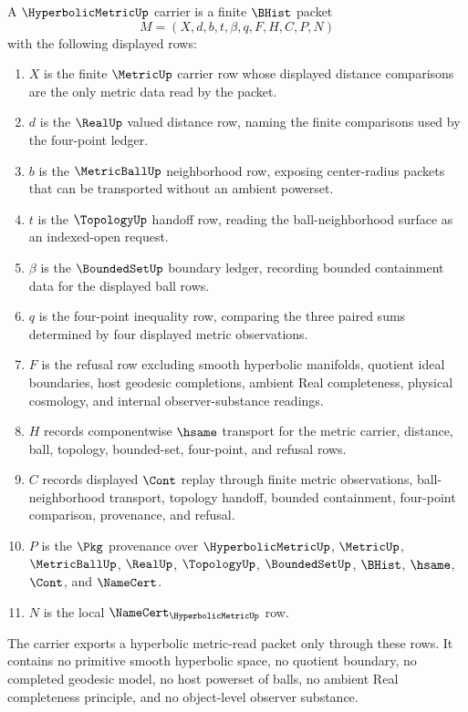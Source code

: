 \begin{definition}
\label{def:hyperbolic-metric-carrier}
A $\HyperbolicMetricUp$ carrier is a finite $\BHist$ packet
$$
M=(X,d,b,t,\beta,q,F,H,C,P,N)
$$
with the following displayed rows:
\begin{enumerate}
\item $X$ is the finite $\MetricUp$ carrier row whose displayed distance comparisons are the only metric data read by the packet.
\item $d$ is the $\RealUp$ valued distance row, naming the finite comparisons used by the four-point ledger.
\item $b$ is the $\MetricBallUp$ neighborhood row, exposing center-radius packets that can be transported without an ambient powerset.
\item $t$ is the $\TopologyUp$ handoff row, reading the ball-neighborhood surface as an indexed-open request.
\item $\beta$ is the $\BoundedSetUp$ boundary ledger, recording bounded containment data for the displayed ball rows.
\item $q$ is the four-point inequality row, comparing the three paired sums determined by four displayed metric observations.
\item $F$ is the refusal row excluding smooth hyperbolic manifolds, quotient ideal boundaries, host geodesic completions, ambient Real completeness, physical cosmology, and internal observer-substance readings.
\item $H$ records componentwise $\hsame$ transport for the metric carrier, distance, ball, topology, bounded-set, four-point, and refusal rows.
\item $C$ records displayed $\Cont$ replay through finite metric observations, ball-neighborhood transport, topology handoff, bounded containment, four-point comparison, provenance, and refusal.
\item $P$ is the $\Pkg$ provenance over $\HyperbolicMetricUp$, $\MetricUp$, $\MetricBallUp$, $\RealUp$, $\TopologyUp$, $\BoundedSetUp$, $\BHist$, $\hsame$, $\Cont$, and $\NameCert$.
\item $N$ is the local $\NameCert_{\HyperbolicMetricUp}$ row.
\end{enumerate}
The carrier exports a hyperbolic metric-read packet only through these rows. It contains no primitive smooth hyperbolic space, no quotient boundary, no completed geodesic model, no host powerset of balls, no ambient Real completeness principle, and no object-level observer substance.
\end{definition}

